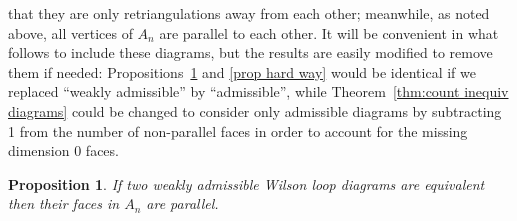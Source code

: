 \documentclass[11pt]{article}
\newtheorem{prop}[thm]{Proposition}
\theoremstyle{remark}
\theoremstyle{definition}
\begin{document}
that they are only retriangulations away from each other; meanwhile, as noted above, all vertices of $A_n$ are parallel to each other.  It will be convenient in what follows to include these diagrams, but the results are easily modified to remove them if needed: Propositions~\ref{prop easy way} and \ref{prop hard way} would be identical if we replaced ``weakly admissible'' by ``admissible'', while Theorem~\ref{thm:count inequiv diagrams} could be changed to consider only admissible diagrams by subtracting 1 from the number of non-parallel faces in order to account for the missing dimension 0 faces.

\begin{prop}\label{prop easy way}
  If two weakly admissible Wilson loop diagrams are equivalent then their faces in $A_n$ are parallel.
\end{prop}
\end{document}
